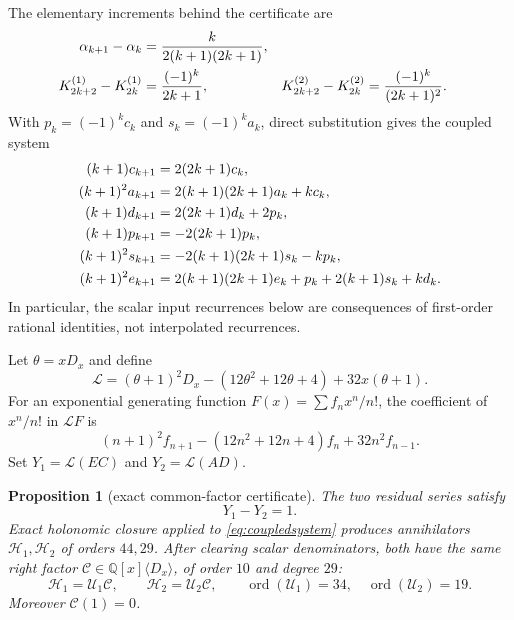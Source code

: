 \documentclass[11pt]{article}
\newtheorem{proposition}[theorem]{Proposition}
\theoremstyle{definition}
\theoremstyle{remark}
\newcommand{\Q}{\mathbb Q}
\newcommand{\ord}{\operatorname{ord}}
\begin{document}
The elementary increments behind the certificate are
\begin{align}
 \alpha_{k+1}-\alpha_k&=\frac{k}{2(k+1)(2k+1)},\notag\\
 K_{2k+2}^{(1)}-K_{2k}^{(1)}&=\frac{(-1)^k}{2k+1},&
 K_{2k+2}^{(2)}-K_{2k}^{(2)}&=\frac{(-1)^k}{(2k+1)^2}.
 \label{eq:increments}
\end{align}
With $p_k=(-1)^kc_k$ and $s_k=(-1)^ka_k$, direct substitution gives the coupled system
\begin{align}
 (k+1)c_{k+1}&=2(2k+1)c_k,\notag\\
 (k+1)^2a_{k+1}&=2(k+1)(2k+1)a_k+kc_k,\notag\\
 (k+1)d_{k+1}&=2(2k+1)d_k+2p_k,\notag\\
 (k+1)p_{k+1}&=-2(2k+1)p_k,\label{eq:coupledsystem}\\
 (k+1)^2s_{k+1}&=-2(k+1)(2k+1)s_k-kp_k,\notag\\
 (k+1)^2e_{k+1}&=2(k+1)(2k+1)e_k+p_k+2(k+1)s_k+kd_k.\notag
\end{align}
In particular, the scalar input recurrences below are consequences of first-order
rational identities, not interpolated recurrences.

Let $\theta=xD_x$ and define
\begin{equation}\label{eq:LaperyEGF}
 \mathcal L=(\theta+1)^2D_x-(12\theta^2+12\theta+4)+32x(\theta+1).
\end{equation}
For an exponential generating function $F(x)=\sum f_nx^n/n!$, the coefficient of
$x^n/n!$ in $\mathcal LF$ is
\[
 (n+1)^2f_{n+1}-(12n^2+12n+4)f_n+32n^2f_{n-1}.
\]
Set $Y_1=\mathcal L(EC)$ and $Y_2=\mathcal L(AD)$.

\begin{proposition}[exact common-factor certificate]\label{prop:OreCatalan}
The two residual series satisfy
\begin{equation}\label{eq:Ydifference}
 Y_1-Y_2=1.
\end{equation}
Exact holonomic closure applied to \eqref{eq:coupledsystem} produces annihilators
$\mathcal H_1,\mathcal H_2$ of orders $44,29$.  After clearing scalar denominators,
both have the same right factor $\mathcal C\in\Q[x]\langle D_x\rangle$, of order $10$
and degree $29$:
\begin{equation}\label{eq:rightfactors}
 \mathcal H_1=\mathcal U_1\mathcal C,\qquad
 \mathcal H_2=\mathcal U_2\mathcal C,\qquad
 \ord(\mathcal U_1)=34,\quad\ord(\mathcal U_2)=19.
\end{equation}
Moreover $\mathcal C(1)=0$.
\end{proposition}
\end{document}
